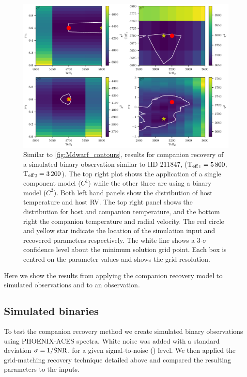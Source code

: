 \begin{figure}
    \centering
    \includegraphics[width=0.7\linewidth]{figures/companion_recovery/HD211847_example_pcolors}
    \caption{Similar to \cref{fig:Mdwarf_contours}, \textchisquared{} results for companion recovery of a simulated binary observation similar to {HD 211847}, (\({\textrm{T}_{\mathrm{eff}}}_{1} = 5\,800\)\K{}, \({\textrm{T}_{\mathrm{eff}}}_{2}=3\,200\)\K{}).
    The top right plot shows the application of a single component model (\(C^1\)) while the other three are using a binary model (\(C^2\)).
    Both left hand panels show the distribution of host temperature and host {RV}.
    The top right panel shows the distribution for host and companion temperature, and the bottom right the companion temperature and radial velocity.
    The red circle and yellow star indicate the location of the simulation input and recovered parameters respectively.
    The white line shows a 3-\(\sigma\) confidence level about the minimum \textchisquared{} solution grid point.
    Each box is centred on the parameter values and shows the grid resolution.}
    \label{fig:HD211847_simulated_contours}
\end{figure}
Here we show the results from applying the companion recovery model to simulated observations and to an observation.


\subsection{Simulated binaries}
\label{subsec:simulated_binaries}
To test the companion recovery method we create simulated binary observations using {PHOENIX-ACES} spectra.
White noise was added with a standard deviation \(\rm \sigma = 1/{\textrm{SNR}{}}\), for a given signal-to-noise (\snr{}) level.
We then applied the grid-matching recovery technique detailed above and compared the resulting parameters to the inputs.

